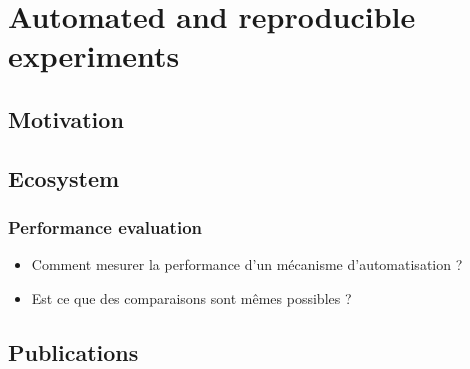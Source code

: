 \chapter{Automated and reproducible experiments} %
\label{cha:automated_and_reproducible_experiments}

\minitoc

\section{Motivation} %
\label{sec:automation_motivation}

\cite{leone2013makesense}
\lipsum


\section{Ecosystem} %
\label{sec:automation_ecosystem}

\lipsum

\subsection{Performance evaluation} %
\label{sub:performance_evaluation}

\begin{itemize}
	\item Comment mesurer la performance d'un mécanisme d'automatisation ?
	\item Est ce que des comparaisons sont mêmes possibles ?
\end{itemize}



\section{Publications} %
\label{sec:automated_publications}


